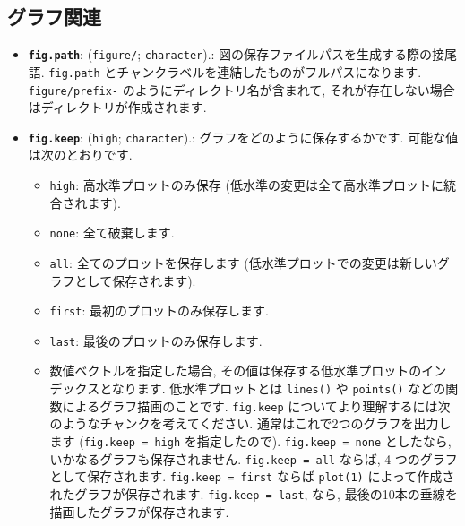 \documentclass[
  lualatex,ja=standard,jafont=noto-otf]{bxjsreport}
\providecommand{\tightlist}{%
  \setlength{\itemsep}{0pt}\setlength{\parskip}{0pt}}
\begin{document}
\hypertarget{plots}{%
\subsection{グラフ関連}\label{plots}}

\begin{itemize}
\tightlist
\item
  \textbf{\texttt{fig.path}}:
  (\texttt{\textquotesingle{}figure/\textquotesingle{}};
  \texttt{character}).: 図の保存ファイルパスを生成する際の接尾語.
  \texttt{fig.path} とチャンクラベルを連結したものがフルパスになります.
  \texttt{figure/prefix-} のようにディレクトリ名が含まれて,
  それが存在しない場合はディレクトリが作成されます.
\item
  \textbf{\texttt{fig.keep}}:
  (\texttt{\textquotesingle{}high\textquotesingle{}};
  \texttt{character}).: グラフをどのように保存するかです.
  可能な値は次のとおりです.

  \begin{itemize}
  \tightlist
  \item
    \texttt{high}: 高水準プロットのみ保存
    (低水準の変更は全て高水準プロットに統合されます).
  \item
    \texttt{none}: 全て破棄します.
  \item
    \texttt{all}: 全てのプロットを保存します
    (低水準プロットでの変更は新しいグラフとして保存されます).
  \item
    \texttt{first}: 最初のプロットのみ保存します.
  \item
    \texttt{last}: 最後のプロットのみ保存します.
  \item
    数値ベクトルを指定した場合,
    その値は保存する低水準プロットのインデックスとなります.
    低水準プロットとは \texttt{lines()} や \texttt{points()}
    などの関数によるグラフ描画のことです. \texttt{fig.keep}
    についてより理解するには次のようなチャンクを考えてください.
    通常はこれで2つのグラフを出力します
    (\texttt{fig.keep\ =\ \textquotesingle{}high\textquotesingle{}}
    を指定したので).
    \texttt{fig.keep\ =\ \textquotesingle{}none\textquotesingle{}}
    としたなら, いかなるグラフも保存されません.
    \texttt{fig.keep\ =\ \textquotesingle{}all\textquotesingle{}}
    ならば, 4 つのグラフとして保存されます.
    \texttt{fig.keep\ =\ \textquotesingle{}first\textquotesingle{}}
    ならば \texttt{plot(1)} によって作成されたグラフが保存されます.
    \texttt{fig.keep\ =\ \textquotesingle{}last\textquotesingle{}},
    なら, 最後の10本の垂線を描画したグラフが保存されます.
  \end{itemize}


\end{itemize}
\end{document}
